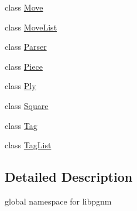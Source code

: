 \begin{DoxyCompactItemize}
class \hyperlink{classpgn_1_1Move}{Move}
\item 
class \hyperlink{classpgn_1_1MoveList}{MoveList}
\item 
class \hyperlink{classpgn_1_1Parser}{Parser}
\item 
class \hyperlink{classpgn_1_1Piece}{Piece}
\item 
class \hyperlink{classpgn_1_1Ply}{Ply}
\item 
class \hyperlink{classpgn_1_1Square}{Square}
\item 
class \hyperlink{classpgn_1_1Tag}{Tag}
\item 
class \hyperlink{classpgn_1_1TagList}{TagList}
\end{DoxyCompactItemize}


\subsection{Detailed Description}
global namespace for libpgnm 